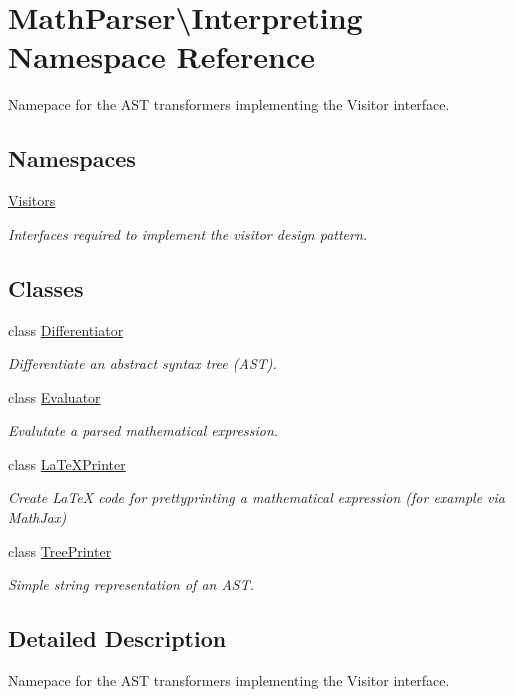\hypertarget{namespaceMathParser_1_1Interpreting}{\section{Math\-Parser\textbackslash{}Interpreting Namespace Reference}
\label{namespaceMathParser_1_1Interpreting}
}


Namepace for the A\-S\-T transformers implementing the Visitor interface.  


\subsection*{Namespaces}
\begin{DoxyCompactItemize}
\item 
\hyperlink{namespaceMathParser_1_1Interpreting_1_1Visitors}{Visitors}
\begin{DoxyCompactList}\small\item\em Interfaces required to implement the visitor design pattern. \end{DoxyCompactList}\end{DoxyCompactItemize}
\subsection*{Classes}
\begin{DoxyCompactItemize}
\item 
class \hyperlink{classMathParser_1_1Interpreting_1_1Differentiator}{Differentiator}
\begin{DoxyCompactList}\small\item\em Differentiate an abstract syntax tree (A\-S\-T). \end{DoxyCompactList}\item 
class \hyperlink{classMathParser_1_1Interpreting_1_1Evaluator}{Evaluator}
\begin{DoxyCompactList}\small\item\em Evalutate a parsed mathematical expression. \end{DoxyCompactList}\item 
class \hyperlink{classMathParser_1_1Interpreting_1_1LaTeXPrinter}{La\-Te\-X\-Printer}
\begin{DoxyCompactList}\small\item\em Create La\-Te\-X code for prettyprinting a mathematical expression (for example via Math\-Jax) \end{DoxyCompactList}\item 
class \hyperlink{classMathParser_1_1Interpreting_1_1TreePrinter}{Tree\-Printer}
\begin{DoxyCompactList}\small\item\em Simple string representation of an A\-S\-T. \end{DoxyCompactList}\end{DoxyCompactItemize}


\subsection{Detailed Description}
Namepace for the A\-S\-T transformers implementing the Visitor interface. 